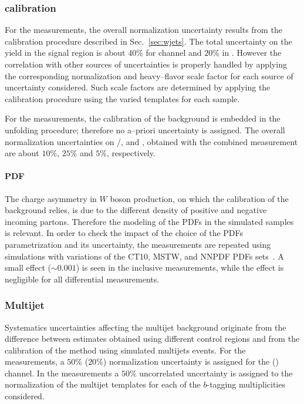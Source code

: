 \subsubsection{\wjets{} calibration}
\label{sec:syst_wjets}

For the \seventev{} measurements, the overall \wjets{} normalization
uncertainty results from the calibration procedure described in
Sec.~\ref{sec:wjets}. The total uncertainty on the \wjets{} yield in
the signal region is about $40\%$ for \ejets{} channel and $20\%$ in
\mujets{}. However the correlation with other sources of uncertainties
is properly handled by applying the corresponding normalization and
heavy--flavor scale factor for each source of uncertainty considered.
Such scale factors are determined by applying the calibration
procedure using the varied templates for each sample.

For the \eighttev{} measurements, the calibration of the \wjets{}
background is embedded in the unfolding procedure; therefore no
a--priori uncertainty is assigned. The overall normalization
uncertainties on \wbb{}/\wcc{}, \wc{} and \wlight, obtained with the
combined \ljets{} measurement  are about $10\%$, $25\%$ and $5\%$,
respectively.

\paragraph{PDF}
\label{sec:syst_pdf}

The charge asymmetry in $W$ boson production, on which the calibration
of the \wjets{} background relies, is due to the different density of
positive and negative incoming partons. Therefore the modeling of the
PDFs in the simulated \wjets{} samples is relevant. In order to check
the impact of the choice of the PDFs parametrization and its
uncertainty, the measurements are repeated using \wjets{} simulations
with variations of the CT10, MSTW, and NNPDF PDFs
sets~\cite{pdf4lhc}. A small effect ($\sim0.001$) is seen in the
inclusive \ac{} measurements, while the effect is negligible for all
differential measurements.

\subsubsection{Multijet}
\label{sec:syst_qcd}

Systematics uncertainties affecting the multijet background originate
from the difference between estimates obtained using different control
regions and from the calibration of the method using simulated
multijets events. For the \seventev{} measurements, a $50\%$ ($20\%$)
normalization uncertainty is assigned for the \ejets{} (\mujets{})
channel.
In the \eighttev{} measurements a $50\%$ uncorrelated uncertainty is assigned to the
normalization of the multijet templates for each of the $b$-tagging
multiplicities considered.

